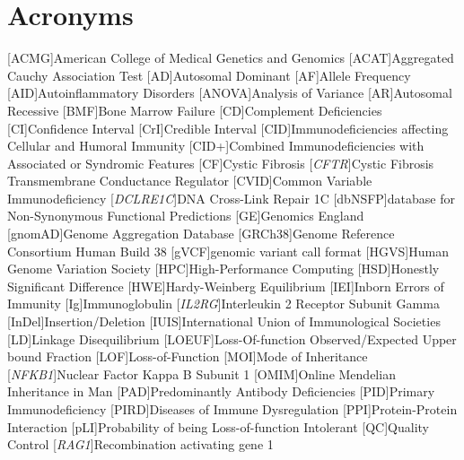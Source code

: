 \section*{Acronyms}
\renewenvironment{description}%
  {\list{}{\labelwidth0pt\itemindent-\leftmargin
    \parsep-.5em\itemsep0pt\let\makelabel\descriptionlabel}}
  {\endlist}
\begin{acronym}
[ACMG]{American College of Medical Genetics and Genomics}%
[ACAT]{Aggregated Cauchy Association Test}%
[AD]{Autosomal Dominant}%
  [AF]{Allele Frequency}
 [AID]{Autoinflammatory Disorders}
 [ANOVA]{Analysis of Variance}
 [AR]{Autosomal Recessive}
 [BMF]{Bone Marrow Failure}
 [CD]{Complement Deficiencies}
 [CI]{Confidence Interval}
 [CrI]{Credible Interval}
 [CID]{Immunodeficiencies affecting Cellular and Humoral Immunity}
 [CID+]{Combined Immunodeficiencies with Associated or Syndromic Features}
 [CF]{Cystic Fibrosis}
 [\textit{CFTR}]{Cystic Fibrosis Transmembrane Conductance Regulator}
 [CVID]{Common Variable Immunodeficiency}
  [\textit{DCLRE1C}]{DNA Cross-Link Repair 1C}
 [dbNSFP]{database for Non-Synonymous Functional Predictions}
 [GE]{Genomics England} 
 [gnomAD]{Genome Aggregation Database}
 [GRCh38]{Genome Reference Consortium Human Build 38}
[gVCF]{genomic variant call format}
 [HGVS]{Human Genome Variation Society}
 [HPC]{High-Performance Computing}
 [HSD]{Honestly Significant Difference}
 [HWE]{Hardy-Weinberg Equilibrium}
 [IEI]{Inborn Errors of Immunity}
  [Ig]{Immunoglobulin}
 [\textit{IL2RG}]{Interleukin 2 Receptor Subunit Gamma}
 [InDel]{Insertion/Deletion}
 [IUIS]{International Union of Immunological Societies}
 [LD]{Linkage Disequilibrium}
 [LOEUF]{Loss-Of-function Observed/Expected Upper bound Fraction}
 [LOF]{Loss-of-Function}
 [MOI]{Mode of Inheritance}
 [\textit{NFKB1}]{Nuclear Factor Kappa B Subunit 1}
 [OMIM]{Online Mendelian Inheritance in Man}
 [PAD]{Predominantly Antibody Deficiencies}
 [PID]{Primary Immunodeficiency}
 [PIRD]{Diseases of Immune Dysregulation}
 [PPI]{Protein-Protein Interaction}
 [pLI]{Probability of being Loss-of-function Intolerant}
 [QC]{Quality Control}
 [\textit{RAG1}]{Recombination activating gene 1}

\end{acronym}
